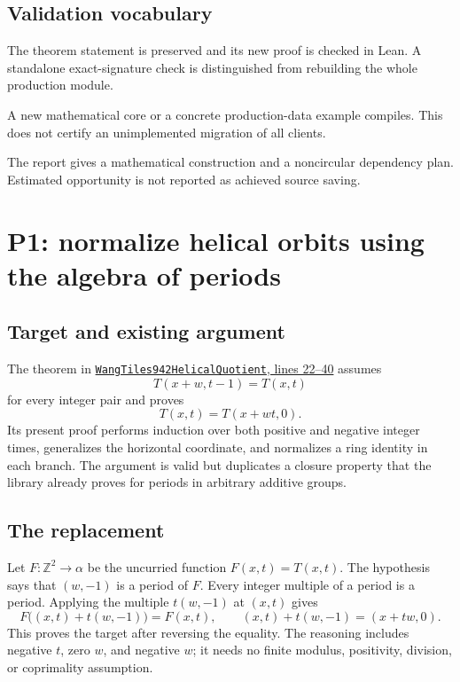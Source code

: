 \documentclass[11pt]{article}
\newcommand{\code}[1]{\texttt{\detokenize{#1}}}
\newcommand{\src}[2]{\href{https://github.com/VladimirReshetnikov/ProveIt/blob/553a5f7a463cbaab8800ff8148fef0bc5a9e1b22/Computability/DiophantineConsistency/Lean/DiophantineConsistency/#1.lean}{\texttt{#1}, #2}}
\begin{document}
\subsection{Validation vocabulary}

\begin{description}[style=unboxed,leftmargin=0pt,labelindent=0pt]
\item[Exact local replacement.] The theorem statement is preserved and its new proof is checked in Lean. A standalone exact-signature check is distinguished from rebuilding the whole production module.
\item[Checked helper or pilot.] A new mathematical core or a concrete production-data example compiles. This does not certify an unimplemented migration of all clients.
\item[Architectural proposal.] The report gives a mathematical construction and a noncircular dependency plan. Estimated opportunity is not reported as achieved source saving.
\end{description}

\ValidationSummary

\section{P1: normalize helical orbits using the algebra of periods}
\label{sec:periods}

\subsection{Target and existing argument}

The theorem \code{row_zero_of_helix} in \src{WangTiles942HelicalQuotient}{lines 22--40} assumes
\[
 T(x+w,t-1)=T(x,t)
\]
for every integer pair and proves
\[
 T(x,t)=T(x+wt,0).
\]
Its present proof performs induction over both positive and negative integer times, generalizes the horizontal coordinate, and normalizes a ring identity in each branch. The argument is valid but duplicates a closure property that the library already proves for periods in arbitrary additive groups.

\subsection{The replacement}

Let \(F:\mathbb Z^2\to\alpha\) be the uncurried function \(F(x,t)=T(x,t)\). The hypothesis says that \((w,-1)\) is a period of \(F\). Every integer multiple of a period is a period. Applying the multiple \(t(w,-1)\) at \((x,t)\) gives
\[
 F\bigl((x,t)+t(w,-1)\bigr)=F(x,t),
 \qquad (x,t)+t(w,-1)=(x+tw,0).
\]
This proves the target after reversing the equality. The reasoning includes negative \(t\), zero \(w\), and negative \(w\); it needs no finite modulus, positivity, division, or coprimality assumption.
\end{document}
